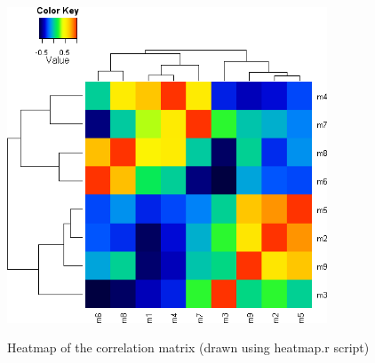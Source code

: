 \documentclass[english,a4paper,12pt]{article}
\begin{document}
\begin{figure}[p]
\centering
\includegraphics[width=0.85\textwidth]{images/cor_heatmap.png} \\
\caption[Correlation heatmap]{Heatmap of the correlation matrix (drawn using \textsf{heatmap.r} script)}
\label{fig:cor_heatmap}
\end{figure}
\end{document}
